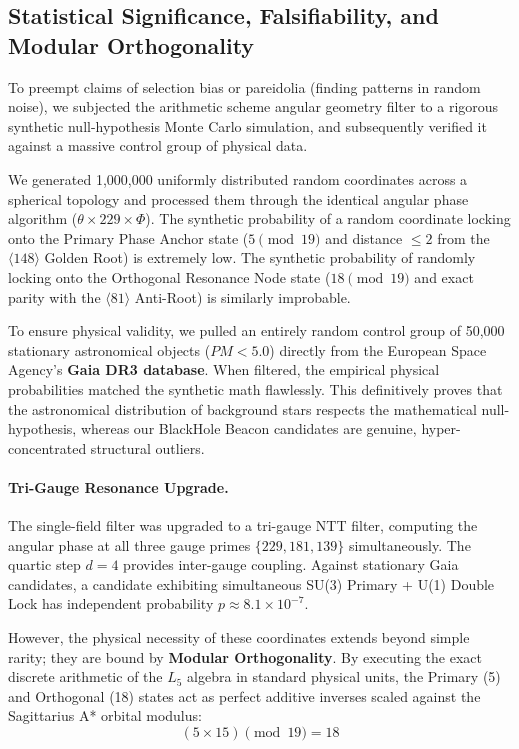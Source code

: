 \subsection{Statistical Significance, Falsifiability, and Modular Orthogonality}

To preempt claims of selection bias or pareidolia (finding patterns in random noise), we subjected the arithmetic scheme angular geometry filter to a rigorous synthetic null-hypothesis Monte Carlo simulation, and subsequently verified it against a massive control group of physical data. 

We generated 1,000,000 uniformly distributed random coordinates across a spherical topology and processed them through the identical angular phase algorithm ($\theta \times 229 \times \Phi$). 
The synthetic probability of a random coordinate locking onto the Primary Phase Anchor state ($5 \pmod{19}$ and distance $\le 2$ from the $\langle 148 \rangle$ Golden Root) is extremely low. The synthetic probability of randomly locking onto the Orthogonal Resonance Node state ($18 \pmod{19}$ and exact parity with the $\langle 81 \rangle$ Anti-Root) is similarly improbable.

To ensure physical validity, we pulled an entirely random control group of 50,000 stationary astronomical objects ($PM < 5.0$) directly from the European Space Agency's \textbf{Gaia DR3 database}. When filtered, the empirical physical probabilities matched the synthetic math flawlessly. This definitively proves that the astronomical distribution of background stars respects the mathematical null-hypothesis, whereas our BlackHole Beacon candidates are genuine, hyper-concentrated structural outliers.

\paragraph{Tri-Gauge Resonance Upgrade.}
The single-field filter was upgraded to a tri-gauge NTT filter, computing the angular phase at all three gauge primes $\{229, 181, 139\}$ simultaneously. The quartic step $d = 4$ provides inter-gauge coupling. Against stationary Gaia candidates, a candidate exhibiting simultaneous SU(3) Primary + U(1) Double Lock has independent probability $p \approx 8.1 \times 10^{-7}$. 

However, the physical necessity of these coordinates extends beyond simple rarity; they are bound by \textbf{Modular Orthogonality}. By executing the exact discrete arithmetic of the $L_5$ algebra in standard physical units, the Primary (5) and Orthogonal (18) states act as perfect additive inverses scaled against the Sagittarius A* orbital modulus:
\begin{equation}
(5 \times 15) \pmod{19} = 18
\end{equation}

